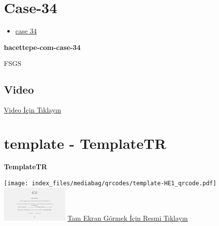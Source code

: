 \documentclass[
  letterpaper,
  DIV=11,
  numbers=noendperiod]{scrreprt}
\providecommand{\tightlist}{%
  \setlength{\itemsep}{0pt}\setlength{\parskip}{0pt}}\usepackage{longtable,booktabs,array}
\begin{document}
\hypertarget{sec-hacettepe-case-of-the-month-case-34}{%
\section{Case-34}\label{sec-hacettepe-case-of-the-month-case-34}}

\begin{itemize}
\tightlist
\item
  \href{https://www.youtube.com/watch?v=bcIvt60vba0&ab_channel=KemalKosemehmetoglu}{case
  34}
\end{itemize}

\textbf{hacettepe-com-case-34}

\begin{tcolorbox}[enhanced jigsaw, breakable, opacitybacktitle=0.6, arc=.35mm, colbacktitle=quarto-callout-tip-color!10!white, colback=white, toptitle=1mm, left=2mm, opacityback=0, colframe=quarto-callout-tip-color-frame, titlerule=0mm, rightrule=.15mm, bottomrule=.15mm, toprule=.15mm, bottomtitle=1mm, title=\textcolor{quarto-callout-tip-color}{\faLightbulb}\hspace{0.5em}{Tanı}, coltitle=black, leftrule=.75mm]

FSGS

\end{tcolorbox}

\hypertarget{video-33}{%
\subsection{Video}\label{video-33}}

\href{https://www.youtube.com/watch?v=bcIvt60vba0}{Video İçin Tıklayın}

\hypertarget{sec-template}{%
\section{template - TemplateTR}\label{sec-template}}

\textbf{TemplateTR}

\texttt{[image: index\_files/mediabag/qrcodes/template-HE1\_qrcode.pdf]}
\href{https://images.patolojiatlasi.com/template/HE1.html}{\includegraphics[width=0.25\textwidth,height=\textheight]{./screenshots/thumbnail_template-HE1.png}}
\href{https://images.patolojiatlasi.com/template/HE1.html}{Tam Ekran
Görmek İçin Resmi Tıklayın}
\end{document}
